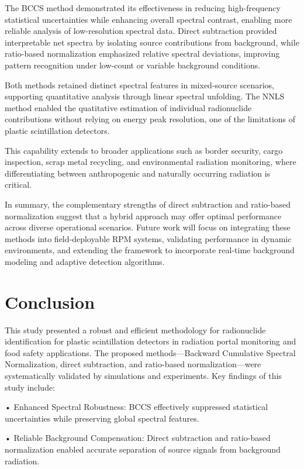 \documentclass[10pt]{wlscirep}
\begin{document}
The BCCS method demonstrated its effectiveness in reducing high-frequency statistical uncertainties while enhancing overall spectral contrast, enabling more reliable analysis of low-resolution spectral data. Direct subtraction provided interpretable net spectra by isolating source contributions from background, while ratio-based normalization emphasized relative spectral deviations, improving pattern recognition under low-count or variable background conditions.

Both methods retained distinct spectral features in mixed-source scenarios, supporting quantitative analysis through linear spectral unfolding. The NNLS method enabled the quatitative estimation of individual radionuclide contributions without relying on energy peak resolution, one of the limitations of plastic scintillation detectors.

This capability extends to broader applications such as border security, cargo inspection, scrap metal recycling, and environmental radiation monitoring, where differentiating between anthropogenic and naturally occurring radiation is critical.

In summary, the complementary strengths of direct subtraction and ratio-based normalization suggest that a hybrid approach may offer optimal performance across diverse operational scenarios. Future work will focus on integrating these methods into field-deployable RPM systems, validating performance in dynamic environments, and extending the framework to incorporate real-time background modeling and adaptive detection algorithms.

\section*{Conclusion}

This study presented a robust and efficient methodology for radionuclide identification for plastic scintillation detectors in radiation portal monitoring and food safety applications. The proposed methods—Backward Cumulative Spectral Normalization, direct subtraction, and ratio-based normalization—were systematically validated by simulations and experiments. Key findings of this study include:

• Enhanced Spectral Robustness: BCCS effectively suppressed statistical uncertainties while preserving global spectral features.

• Reliable Background Compensation: Direct subtraction and ratio-based normalization enabled accurate separation of source signals from background radiation.
\end{document}
